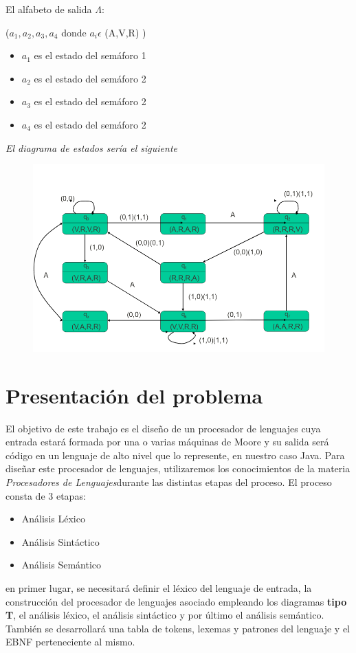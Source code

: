 \documentclass[12pt,a4paper]{article}
\begin{document}
El alfabeto de salida $\Lambda$: { ($a_{1},a_{2},a_{3},a_{4}$ donde $a_{i}\epsilon$ (A,V,R) )
	\begin{itemize}
		\item $a_{1}$ es el estado del semáforo 1
		\item $a_{2}$ es el estado del semáforo 2
		\item $a_{3}$ es el estado del semáforo 2
		\item $a_{4}$ es el estado del semáforo 2
	\end{itemize}

	\begin{center}
		\textit{El diagrama de estados sería el siguiente}
	\end{center}

	\begin{figure}[h]
		\centering
		\includegraphics[width=0.7
		\linewidth]{img/3}
		\caption{}
		\label{fig:3}
	\end{figure}

\newpage
\section{Presentación del problema}
El objetivo de este trabajo es el diseño de un procesador de lenguajes cuya entrada estará formada por una o varias máquinas de Moore y su salida será código en un lenguaje de alto nivel que lo represente, en nuestro caso Java.
\newline
\newline
Para diseñar este procesador de lenguajes, utilizaremos los conocimientos de la materia \textit{Procesadores de Lenguajes}durante las distintas etapas del proceso. El proceso consta de 3 etapas:
\newline
\begin{itemize}
	\item Análisis Léxico
	\item Análisis Sintáctico
	\item Análisis Semántico
\end{itemize}
\newline
en primer lugar, se necesitará definir el léxico del lenguaje de entrada, la construcción del procesador de lenguajes asociado empleando los diagramas \textbf{tipo T}, el análisis léxico, el análisis sintáctico y por último el análisis semántico.
\newline
\newline
También se desarrollará una tabla de tokens, lexemas y patrones del lenguaje y el EBNF perteneciente al mismo.
}
\end{document}
